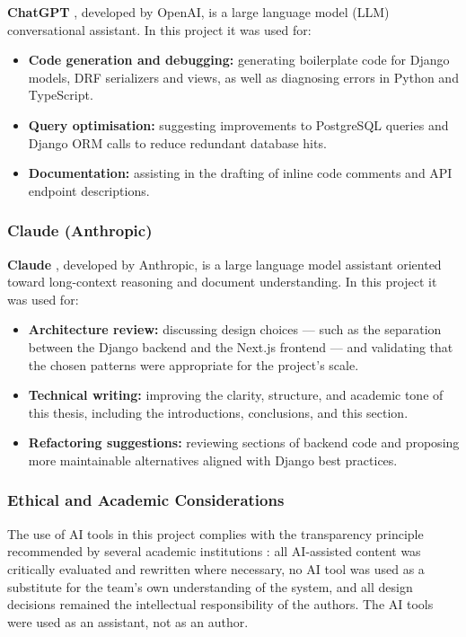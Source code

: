 \textbf{ChatGPT} \cite{OpenAI2024ChatGPT}, developed by OpenAI, is a large language model (LLM) conversational assistant. In this project it was used for:

\begin{itemize}
	\item \textbf{Code generation and debugging:} generating boilerplate code for Django models, DRF serializers and views, as well as diagnosing errors in Python and TypeScript.
	\item \textbf{Query optimisation:} suggesting improvements to PostgreSQL queries and Django ORM calls to reduce redundant database hits.
	\item \textbf{Documentation:} assisting in the drafting of inline code comments and API endpoint descriptions.
\end{itemize}

\subsubsection{Claude (Anthropic)}

\textbf{Claude} \cite{Anthropic2024Claude}, developed by Anthropic, is a large language model assistant oriented toward long-context reasoning and document understanding. In this project it was used for:

\begin{itemize}
	\item \textbf{Architecture review:} discussing design choices — such as the separation between the Django backend and the Next.js frontend — and validating that the chosen patterns were appropriate for the project's scale.
	\item \textbf{Technical writing:} improving the clarity, structure, and academic tone of this thesis, including the introductions, conclusions, and this section.
	\item \textbf{Refactoring suggestions:} reviewing sections of backend code and proposing more maintainable alternatives aligned with Django best practices.
\end{itemize}

\subsubsection{Ethical and Academic Considerations}

The use of AI tools in this project complies with the transparency principle recommended by several academic institutions \cite{Perkins2023AIAcademic}: all AI-assisted content was critically evaluated and rewritten where necessary, no AI tool was used as a substitute for the team's own understanding of the system, and all design decisions remained the intellectual responsibility of the authors. The AI tools were used as an assistant, not as an author.

